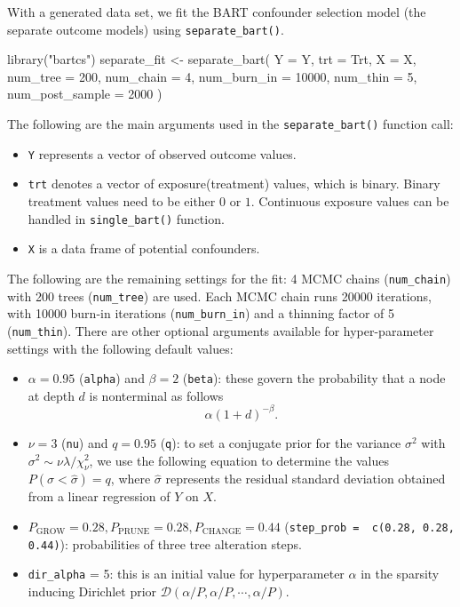 With a generated data set, we fit the BART confounder selection model (the separate outcome models) using \verb|separate_bart()|.
\begin{example}
library("bartcs")
separate_fit <- separate_bart(
     Y = Y, trt = Trt, X = X, num_tree = 200, num_chain = 4, 
     num_burn_in = 10000, num_thin = 5, num_post_sample = 2000
   )
\end{example}
The following are the main arguments used in the \verb|separate_bart()| function call:
\begin{itemize}
\item \verb|Y| represents a vector of observed outcome values.
\item \verb|trt| denotes a vector of exposure(treatment) values, which is binary. Binary treatment values need to be either $0$ or $1$. Continuous exposure values can be handled in  \verb|single_bart()| function.
\item \verb|X| is a data frame of potential confounders.
\end{itemize}
The following are the remaining settings for the fit: 4 MCMC chains (\verb|num_chain|) with 200 trees (\verb|num_tree|) are used. Each MCMC chain runs 20000 iterations, with 10000 burn-in iterations (\verb|num_burn_in|) and a thinning factor of 5 (\verb|num_thin|). There are other optional arguments available for hyper-parameter settings with the following default values: 
\begin{itemize}
\item $\alpha=0.95$ (\verb|alpha|) and $\beta=2$ (\verb|beta|): these govern the probability that a node at depth $d$ is nonterminal as follows
\[\alpha(1+d)^{-\beta}.\]
\item $\nu=3$ (\verb|nu|) and $q = 0.95$ (\verb|q|): to set a conjugate prior for the variance $\sigma^2$ with $\sigma^2 \sim \nu \lambda / \chi_\nu^2$, we use the following equation to determine the values $P(\sigma < \hat{\sigma}) = q$, where $\hat{\sigma}$ represents the residual standard deviation obtained from a linear regression of $Y$ on $X$.
\item $P_\text{GROW}=0.28, P_\text{PRUNE}=0.28, P_\text{CHANGE}=0.44$ (\verb|step_prob =  c(0.28, 0.28, 0.44)|): probabilities of three  tree alteration steps.
\item \verb|dir_alpha| = 5: this is an initial value for hyperparameter $\alpha$ in the sparsity inducing Dirichlet prior $\mathcal{D}(\alpha/P, \alpha/P, \cdots, \alpha/P)$.
\end{itemize}

